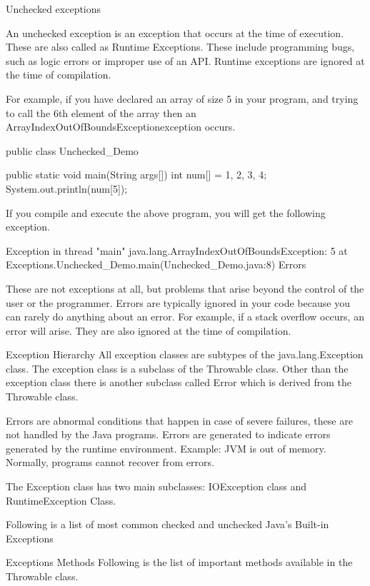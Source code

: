 Unchecked exceptions

An unchecked exception is an exception that occurs at the time of execution. These are also called as Runtime Exceptions. These include programming bugs, such as logic errors or improper use of an API. Runtime exceptions are ignored at the time of compilation.

For example, if you have declared an array of size 5 in your program, and trying to call the 6th element of the array then an ArrayIndexOutOfBoundsExceptionexception occurs.

public class Unchecked_Demo {

   public static void main(String args[]) {
      int num[] = {1, 2, 3, 4};
      System.out.println(num[5]);
   }
}
If you compile and execute the above program, you will get the following exception.

Exception in thread "main" java.lang.ArrayIndexOutOfBoundsException: 5
    at Exceptions.Unchecked_Demo.main(Unchecked_Demo.java:8)
Errors

These are not exceptions at all, but problems that arise beyond the control of the user or the programmer. Errors are typically ignored in your code because you can rarely do anything about an error. For example, if a stack overflow occurs, an error will arise. They are also ignored at the time of compilation.

Exception Hierarchy
All exception classes are subtypes of the java.lang.Exception class. The exception class is a subclass of the Throwable class. Other than the exception class there is another subclass called Error which is derived from the Throwable class.

Errors are abnormal conditions that happen in case of severe failures, these are not handled by the Java programs. Errors are generated to indicate errors generated by the runtime environment. Example: JVM is out of memory. Normally, programs cannot recover from errors.

The Exception class has two main subclasses: IOException class and RuntimeException Class.



Following is a list of most common checked and unchecked Java's Built-in Exceptions

Exceptions Methods
Following is the list of important methods available in the Throwable class.

